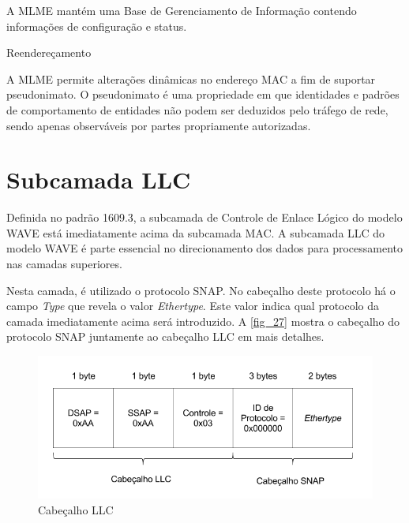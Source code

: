 \documentclass[
12pt,				%
openright,			%
oneside,			%
a4paper,			%
brazil,				%
]{abntex2}
\begin{document}
	\par A MLME mantém uma Base de Gerenciamento de Informação contendo informações de configuração e status.
	
	\begin{description}
        \item[Reendereçamento]
    \end{description}
	
	\par A MLME permite alterações dinâmicas no endereço MAC a fim de suportar pseudonimato. O pseudonimato é uma propriedade  em que identidades e padrões de comportamento de entidades não podem ser deduzidos pelo tráfego de rede, sendo apenas observáveis por partes propriamente autorizadas.
	
	\section{\label{sec:llc}Subcamada LLC}
	
	\par Definida no padrão 1609.3, a subcamada de Controle de Enlace Lógico do modelo WAVE está imediatamente acima da subcamada MAC. A subcamada LLC do modelo WAVE é parte essencial no direcionamento dos dados para processamento nas camadas superiores. 
	
	\par Nesta camada, é utilizado o protocolo SNAP. No cabeçalho deste protocolo há o campo \textit{Type} que revela o valor \textit{Ethertype}. Este valor indica qual protocolo da camada imediatamente acima será introduzido. A \autoref{fig_27} mostra o cabeçalho do protocolo SNAP juntamente ao cabeçalho LLC em mais detalhes.
	
	\begin{figure} [H]
		\centering
		\includegraphics[scale=.5]{figuras/cap3/27CabecalhoLLC}
		\caption{\label{fig_27}Cabeçalho LLC}
	\end{figure}
	
\end{document}
